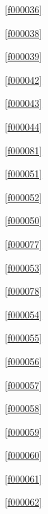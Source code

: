 \noindent\filesourcenumbernameone\ \ref{f000036}\dotfill\pageref{f000036}%

\noindent\filesourcenumbernameone\ \ref{f000038}\dotfill\pageref{f000038}%

\noindent\filesourcenumbernameone\ \ref{f000039}\dotfill\pageref{f000039}%

\noindent\filesourcenumbernameone\ \ref{f000042}\dotfill\pageref{f000042}%

\noindent\filesourcenumbernameone\ \ref{f000043}\dotfill\pageref{f000043}%

\noindent\filesourcenumbernameone\ \ref{f000044}\dotfill\pageref{f000044}%

\noindent\filesourcenumbernameone\ \ref{f000081}\dotfill\pageref{f000081}%

\noindent\filesourcenumbernameone\ \ref{f000051}\dotfill\pageref{f000051}%

\noindent\filesourcenumbernameone\ \ref{f000052}\dotfill\pageref{f000052}%

\noindent\filesourcenumbernameone\ \ref{f000050}\dotfill\pageref{f000050}%

\noindent\filesourcenumbernameone\ \ref{f000077}\dotfill\pageref{f000077}%

\noindent\filesourcenumbernameone\ \ref{f000053}\dotfill\pageref{f000053}%

\noindent\filesourcenumbernameone\ \ref{f000078}\dotfill\pageref{f000078}%

\noindent\filesourcenumbernameone\ \ref{f000054}\dotfill\pageref{f000054}%

\noindent\filesourcenumbernameone\ \ref{f000055}\dotfill\pageref{f000055}%

\noindent\filesourcenumbernameone\ \ref{f000056}\dotfill\pageref{f000056}%

\noindent\filesourcenumbernameone\ \ref{f000057}\dotfill\pageref{f000057}%

\noindent\filesourcenumbernameone\ \ref{f000058}\dotfill\pageref{f000058}%

\noindent\filesourcenumbernameone\ \ref{f000059}\dotfill\pageref{f000059}%

\noindent\filesourcenumbernameone\ \ref{f000060}\dotfill\pageref{f000060}%

\noindent\filesourcenumbernameone\ \ref{f000061}\dotfill\pageref{f000061}%

\noindent\filesourcenumbernameone\ \ref{f000062}\dotfill\pageref{f000062}%


